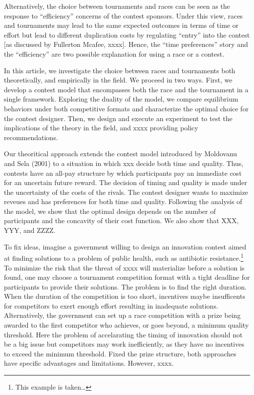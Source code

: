 \documentclass[10pt, titlepage]{article}
\begin{document}
Alternatively, the choice between tournaments and races can be seen as
the response to ``efficiency'' concerns of the contest sponsors. Under
this view, races and tournaments may lead to the same expected outcomes
in terms of time or effort but lead to different duplication costs by
regulating ``entry'' into the contest {[}as discussed by Fullerton
Mcafee, xxxx{]}. Hence, the ``time preferences'' story and the
``efficiency'' are two possible explanation for using a race or a
contest.

In this article, we investigate the choice between races and tournaments
both theoretically, and empirically in the field. We proceed in two
ways. First, we develop a contest model that encompasses both the race
and the tournament in a single framework. Exploring the duality of the
model, we compare equilibrium behaviors under both competitive formats
and characterize the optimal choice for the contest designer. Then, we
design and execute an experiment to test the implications of the theory
in the field, and xxxx providing policy recommendations.

Our theoritical approach extends the contest model introduced by
Moldovanu and Sela (2001) to a situation in which xxx decide both time
and quality. Thus, contests have an all-pay structure by which
participants pay an immediate cost for an uncertain future reward. The
decision of timing and quality is made under the uncertainty of the
costs of the rivals. The contest designer wants to maximize reveues and
has preferences for both time and quality. Following the analysis of the
model, we show that the optimal design depends on the number of
participants and the concavity of their cost function. We also show that
XXX, YYY, and ZZZZ.

To fix ideas, imagine a government willing to design an innovation
contest aimed at finding solutions to a problem of public health, such
as antibiotic resistance.\footnote{This example is taken\ldots{}} To
minimize the risk that the threat of xxxx will materialize before a
solution is found, one may choose a tournament competition format with a
tight deadline for participants to provide their solutions. The problem
is to find the right duration. When the duration of the competition is
too short, incentives maybe insufficents for competitors to exert enough
effort resulting in inadequate solutions. Alternatively, the government
can set up a race competition with a prize being awarded to the first
competitor who achieves, or goes beyond, a minimum quality threshold.
Here the problem of accelarating the timing of innovation should not be
a big issue but competitors may work inefficiently, as they have no
incentives to exceed the minimum threshold. Fixed the prize structure,
both approaches have specific advantages and limitations. However, xxxx.
\end{document}
